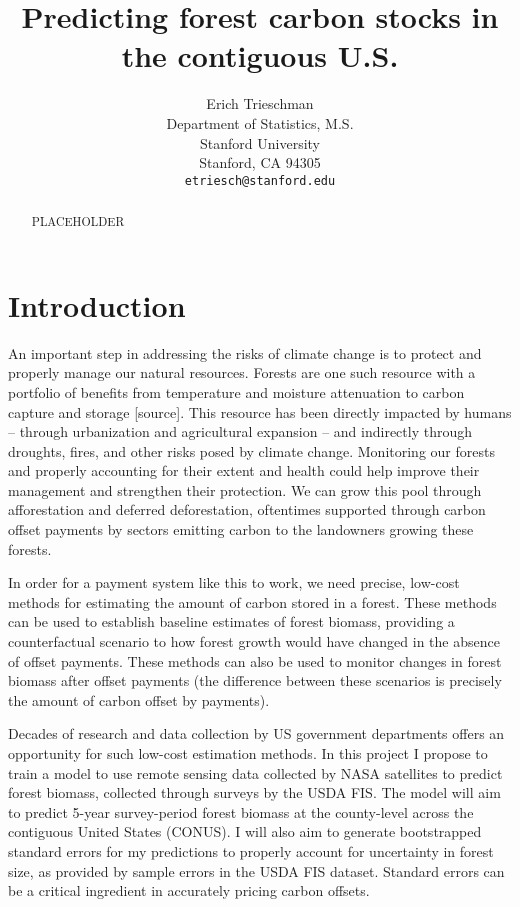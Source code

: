 \documentclass{article}
\title{Predicting forest carbon stocks in the contiguous U.S.}
\author{%
  Erich Trieschman\\
  Department of Statistics, M.S.\\
  Stanford University\\
  Stanford, CA 94305\\
  \texttt{etriesch@stanford.edu} \\
}
\begin{document}
\maketitle

\begin{abstract}
  PLACEHOLDER
\end{abstract}

\section{Introduction}

An important step in addressing the risks of climate change is to protect and properly manage our natural resources. Forests are one such resource with a portfolio of benefits from temperature and moisture attenuation to carbon capture and storage [source]. This resource has been directly impacted by humans – through urbanization and agricultural expansion – and indirectly through droughts, fires, and other risks posed by climate change. Monitoring our forests and properly accounting for their extent and health could help improve their management and strengthen their protection. We can grow this pool through afforestation and deferred deforestation, oftentimes supported through carbon offset payments by sectors emitting carbon to the landowners growing these forests. 

In order for a payment system like this to work, we need precise, low-cost methods for estimating the amount of carbon stored in a forest. These methods can be used to establish baseline estimates of forest biomass, providing a counterfactual scenario to how forest growth would have changed in the absence of offset payments. These methods can also be used to monitor changes in forest biomass after offset payments (the difference between these scenarios is precisely the amount of carbon offset by payments). 

Decades of research and data collection by US government departments offers an opportunity for such low-cost estimation methods. In this project I propose to train a model to use remote sensing data collected by NASA satellites to predict forest biomass, collected through surveys by the USDA FIS. The model will aim to predict 5-year survey-period forest biomass at the county-level across the contiguous United States (CONUS). I will also aim to generate bootstrapped standard errors for my predictions to properly account for uncertainty in forest size, as provided by sample errors in the USDA FIS dataset. Standard errors can be a critical ingredient in accurately pricing carbon offsets.
\end{document}
